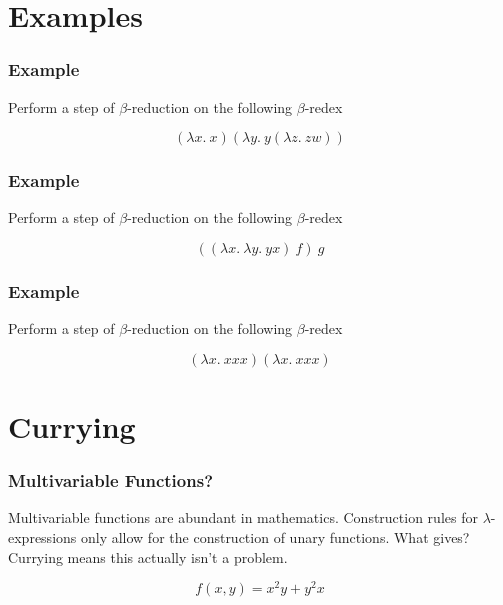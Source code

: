 \documentclass{beamer}
\begin{document}
\section{Examples}
\begin{frame}
	\frametitle{Example}

	Perform a step of $\beta$-reduction on the following $\beta$-redex

	$$(\lambda x. \ x)(\lambda y. \ y (\lambda z. \ z w))$$

	\vspace{7cm}


\end{frame}

\begin{frame}
	\frametitle{Example}

	Perform a step of $\beta$-reduction on the following $\beta$-redex

	$$((\lambda x. \ \lambda y. \ y x) \ f) \ g $$

	\vspace{7cm}


\end{frame}


\begin{frame}
	\frametitle{Example}

	Perform a step of $\beta$-reduction on the following $\beta$-redex

	$$(\lambda x. \ x x x)(\lambda x. \ x x x)$$

	\vspace{7cm}


\end{frame}

\section{Currying}
\begin{frame}
	\frametitle{Multivariable Functions?}

	Multivariable functions are abundant in mathematics. Construction rules for $\lambda$-expressions only allow for the construction of unary functions. What gives? Currying means this actually isn't a problem.

	$$f(x,y) = x^{2}y + y^{2}x$$

	\vspace{7cm}

\end{frame}
\end{document}
